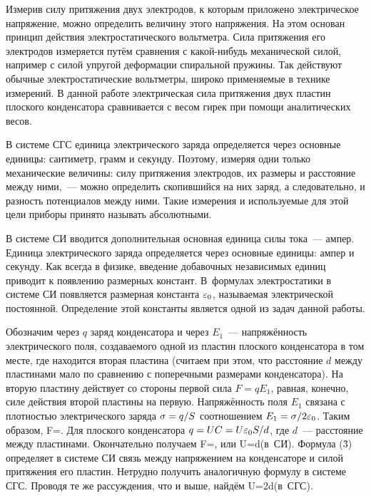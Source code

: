 


Измерив силу притяжения двух электродов, к которым приложено электрическое напряжение, можно определить величину этого
напряжения. На этом основан принцип действия электростатического вольтметра. Сила притяжения его электродов измеряется
путём сравнения с какой-нибудь механической силой, например с силой упругой деформации спиральной пружины. Так действуют
обычные электростатические вольтметры, широко применяемые в технике измерений. В данной работе электрическая сила
притяжения двух пластин плоского конденсатора сравнивается с весом гирек при помощи аналитических весов.

В системе СГС единица электрического заряда определяется через основные единицы: сантиметр, грамм и секунду. Поэтому,
измеряя одни только механические величины: силу притяжения электродов, их размеры и расстояние между ними,~--- можно
определить скопившийся на них заряд, а следовательно, и разность потенциалов между ними. Такие измерения и используемые
для этой цели приборы принято называть абсолютными.

В системе СИ вводится дополнительная основная единица силы тока~--- ампер. Единица электрического заряда определяется
через основные единицы: ампер и секунду. Как всегда в физике, введение добавочных независимых единиц приводит к
появлению размерных констант. В~формулах электростатики в системе СИ появляется размерная константа $\varepsilon_0$, называемая
электрической постоянной. Определение этой константы является одной из задач данной работы.

Обозначим через $q$ заряд конденсатора и через $E_1$~--- напряжённость электрического поля, создаваемого одной из
пластин плоского конденсатора в том месте, где находится вторая пластина (считаем при этом, что расстояние $d$ между
пластинами мало по сравнению с поперечными размерами конденсатора). На вторую пластину действует со стороны первой сила
$F=qE_1$, равная, конечно, силе действия второй пластины на первую. Напряжённость поля $E_1$ связана с плотностью
электрического заряда $\sigma=q/S$ соотношением $E_1=\sigma/2\varepsilon_0$. Таким образом,
F=.
\ee
Для плоского конденсатора $q=UC=U\varepsilon_0S/d$, где $d$~--- расстояние между пластинами. Окончательно получаем
F=,
\ee
или
U=d\qquad(в~СИ).
\ee
Формула (\r{3}) определяет в системе СИ связь между напряжением на конденсаторе и силой притяжения его пластин. Нетрудно
получить аналогичную формулу в системе СГС. Проводя те же рассуждения, что и выше, найдём
U=2d\qquad(в~СГС).
\ee

